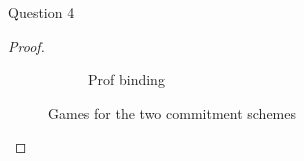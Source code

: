 \begin{solution}{Question 4}
\begin{proof}
\begin{figure}[H]
\begin{subfigure}[b]{0.48\textwidth}
        \caption{Prof binding}
        \label{fig:prof}
      \end{subfigure}
      \caption{Games for the two commitment schemes}
    \end{figure}



    
    

    
    \end{proof}
\end{solution}
 